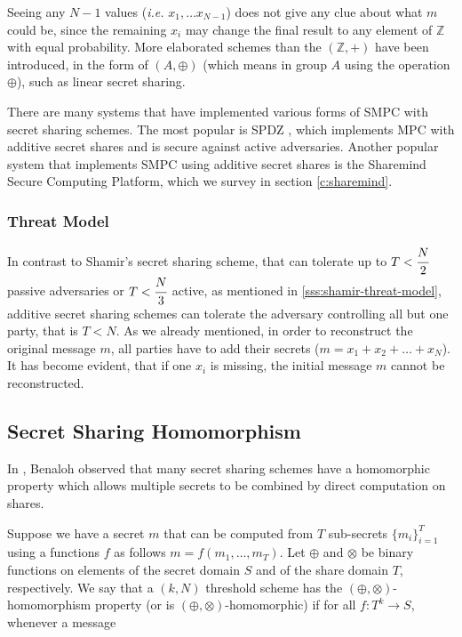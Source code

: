 Seeing any $N-1$ values (\textit{i.e.} $x_1, \dots x_{N-1}$) does not give any clue about what $m$ could be, since the remaining $x_i$ may change the final result to any element of $\mathbb{Z}$ with equal probability.
More elaborated schemes than the $(\mathbb{Z}, +)$ have been introduced, in the form of $(A, \oplus)$ (which means in group $A$ using the operation $\oplus$), such as linear secret sharing.

There are many systems that have implemented various forms of SMPC with secret sharing schemes.
The most popular is SPDZ \cite{damgaard2012multiparty, damgaard2013practical}, which implements MPC with additive secret shares and is secure against active adversaries.
Another popular system that implements SMPC using additive secret shares is the Sharemind Secure Computing Platform, which we survey in section \ref{c:sharemind}.


\subsubsection{Threat Model}\label{sss:additive-threat-model}
In contrast to Shamir's secret sharing scheme, that can tolerate up to $T < \cfrac{N}{2}$ passive adversaries or $T < \cfrac{N}{3}$ active, as mentioned in \ref{sss:shamir-threat-model}, additive secret sharing schemes can tolerate the adversary controlling all but one party, that is $T < N$.
As we already mentioned, in order to reconstruct the original message $m$, all parties have to add their secrets ($m = x_1 + x_2 + \dots + x_N$).
It has become evident, that if one $x_i$ is missing, the initial message $m$ cannot be reconstructed.



\subsection{Secret Sharing Homomorphism}\label{ss:secret-sharing-homomorphism}
In \cite{benaloh1986secret}, Benaloh observed that many secret sharing schemes have a homomorphic property which allows multiple secrets to be combined by direct computation on shares.

Suppose we have a secret $m$ that can be computed from $T$ sub-secrets $\{m_i\}^T_{i=1}$ using a functions $f$ as follows $m = f(m_1, \dots, m_T)$.
Let $\oplus$ and $\otimes$ be binary functions on elements of the secret domain $S$ and of the share domain $T$, respectively.
We say that a $(k, N)$ threshold scheme has the $(\oplus, \otimes)$-homomorphism property (or is $(\oplus, \otimes)$-homomorphic) if for all $f: T^k \rightarrow S$, whenever a message

